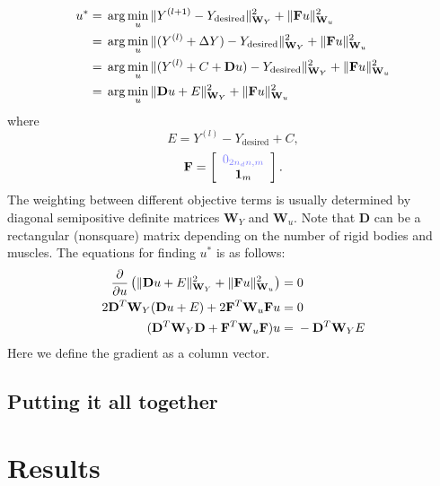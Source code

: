 \documentclass[a4paper,10pt]{article}
\newcommand{\zm}[1]{\ensuremath{ {\color{opaqueblue} 0_{#1} } }}
\begin{document}
\begin{align}
u^*= {} & \arg\min_{u} \| Y^{(l+1)}                            - Y_\text{desired} \|^2_{\mathbf{W}_Y} + \| \mathbf{F}u \|^2_{\mathbf{W}_u} \notag\\
   = {} & \arg\min_{u} \| (Y^{(l)} + \Delta Y)                 - Y_\text{desired} \|^2_{\mathbf{W}_Y} + \| \mathbf{F}u \|^2_{\mathbf{W}_u}\notag\\
   = {} & \arg\min_{u} \| (Y^{(l)} + C + \mathbf{D}u) - Y_\text{desired} \|^2_{\mathbf{W}_Y} + \| \mathbf{F}u \|^2_{\mathbf{W}_u}\notag\\
   = {} & \arg\min_{u} \| \mathbf{D}u + E \|^2_{\mathbf{W}_Y}  + \| \mathbf{F}u \|^2_{\mathbf{W}_u}
\end{align}
where
\begin{equation}
E = Y^{(l)} - Y_\text{desired} + C ,
\end{equation}
\begin{equation}
\mathbf{F} = \left[ \begin{array}{c}
\zm{2n_d n,m}\\
\mathbf{1}_m
\end{array}  \right].
\end{equation}
The weighting between different objective terms is
usually determined by diagonal semipositive definite matrices $\mathbf{W}_Y$ and $\mathbf{W}_u$.
Note that $\mathbf{D}$ can be a rectangular (nonsquare) matrix depending on the number of rigid bodies and
muscles. The equations for finding $u^*$ is as follows:
\begin{align}
\frac{\partial}{\partial u} \left( \| \mathbf{D}u + E \|^2_{\mathbf{W}_Y}  + \| \mathbf{F}u \|^2_{\mathbf{W}_u} \right) = {} & 0  \notag\\
2\mathbf{D}^T\mathbf{W}_Y(\mathbf{D}u+E) + 2\mathbf{F}^T\mathbf{W}_u \mathbf{F}u = {} & 0\notag\\
(\mathbf{D}^T\mathbf{W}_Y\mathbf{D}+\mathbf{F}^T\mathbf{W}_u\mathbf{F})u = {} & -\mathbf{D}^T\mathbf{W}_Y E
\end{align}
Here we define the gradient as a column vector.

\subsection{Putting it all together}

\section{Results}
\end{document}

